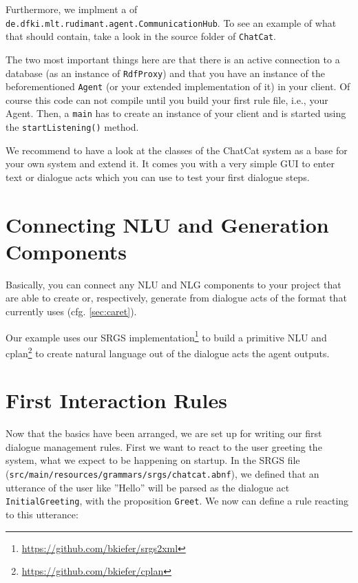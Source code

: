 Furthermore, we implment a
of \texttt{de.dfki.mlt.rudimant.agent.CommunicationHub}. To see an example of
what that should contain, take a look in the source folder of \texttt{ChatCat}.

The two most important things here are that there is an active
connection to a database (as an instance of \texttt{RdfProxy}) and
that you have an instance of the beforementioned \vonda \texttt{Agent}
(or your extended implementation of it) in your client. Of course this
code can not compile until you build your first rule file, i.e., your
\vonda Agent. Then, a \texttt{main} has to create an instance of your
client and is started using the \texttt{startListening()} method.

We recommend to have a look at the classes of the ChatCat system as a base for
your own system and extend it. It comes you with a very simple GUI to enter
text or dialogue acts which you can use to test your first dialogue steps.

\section{Connecting NLU and Generation Components}

Basically, you can connect any NLU and NLG components to your project that are
able to create or, respectively, generate from dialogue acts of the format that
\vonda currently uses (cfg. \ref{sec:caret}).

Our example uses our SRGS
implementation\footnote{\url{https://github.com/bkiefer/srgs2xml}} to
build a primitive NLU and
cplan\footnote{\url{https://github.com/bkiefer/cplan}} to create
natural language out of the dialogue acts the agent outputs.

\section{First Interaction Rules}

Now that the basics have been arranged, we are set up for writing our first
dialogue management rules. First we want to react to the user greeting the
system, what we expect to be happening on startup. In the SRGS file
(\small\texttt{src/main/resources/grammars/srgs/chatcat.abnf}), we defined that
an utterance of the user like ''Hello'' will be parsed as the dialogue act
\texttt{InitialGreeting}, with the proposition \texttt{Greet}. We now can
define a rule reacting to this utterance:

